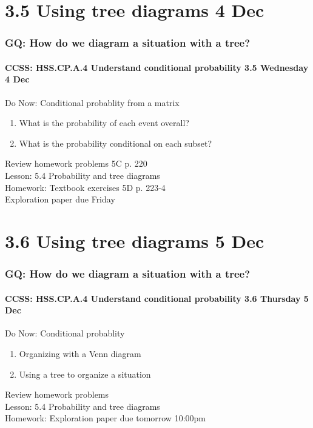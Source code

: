 \documentclass{beamer}
\begin{document}
\section{3.5 Using tree diagrams 4 Dec}
\frame
{
  \frametitle{GQ: How do we diagram a situation with a tree?}
  \framesubtitle{CCSS: HSS.CP.A.4 Understand conditional probability \hfill \alert{3.5 Wednesday 4 Dec}}

  \begin{block}{Do Now: Conditional probablity from a matrix}
  \begin{enumerate}
    \item What is the probability of each event overall?
    \item What is the probability conditional on each subset?
  \end{enumerate}
  \end{block}
  Review homework problems 5C p. 220 \\
  Lesson: 5.4 Probability and tree diagrams \\ \smallskip
  Homework: Textbook exercises 5D p. 223-4 \\
  Exploration paper \alert{due Friday}
}

\section{3.6 Using tree diagrams 5 Dec}
\frame
{
  \frametitle{GQ: How do we diagram a situation with a tree?}
  \framesubtitle{CCSS: HSS.CP.A.4 Understand conditional probability \hfill \alert{3.6 Thursday 5 Dec}}

  \begin{block}{Do Now: Conditional probablity}
  \begin{enumerate}
    \item Organizing with a Venn diagram
    \item Using a tree to organize a situation
  \end{enumerate}
  \end{block}
  Review homework problems \\
  Lesson: 5.4 Probability and tree diagrams \\ \smallskip
  Homework: Exploration paper \alert{due tomorrow 10:00pm}
}
\end{document}

